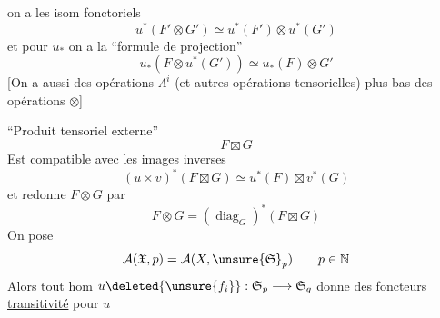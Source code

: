 on a les isom fonctoriels
\[
u^*(F'\otimes G')\simeq u^*(F')\otimes u^*(G')
\]
et pour $u_*$ on a la ``formule de projection''
\[
u_*(F\otimes u^*(G'))\simeq u_*(F)\otimes G'
\]
[On a aussi des opérations $\Lambda^i$ (et autres opérations tensorielles)  plus bas des opérations $\otimes$]

``Produit tensoriel externe''
\[
F\boxtimes G
\]
Est compatible avec les images inverses
\[
(u\times v)^*(F\boxtimes G)\simeq u^*(F)\boxtimes v^*(G)
\]
et redonne $F\otimes G$ par
\[
F\otimes G=(\operatorname{diag}_G)^*(F\boxtimes G)
\]
On pose
\[
\mathcal A(\mathfrak X,p)=\mathcal A(X,\unsure{\mathfrak S}_p)\qquad p\in\mathbb N
\]
Alors tout hom $u\deleted{\unsure{f_i}}:\mathfrak S_p\longrightarrow\mathfrak S_q$ donne des foncteurs
 \uline{transitivité} pour $u$
